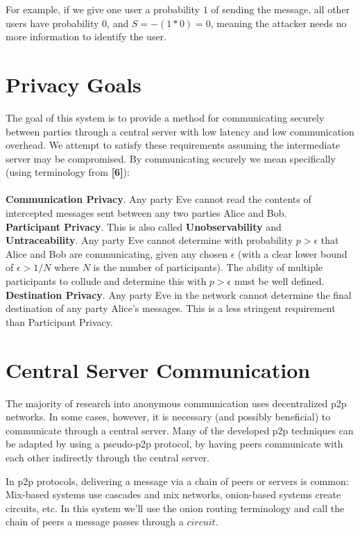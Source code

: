 \documentclass{paper}
\begin{document}
For example, if we give one user a probability $1$ of sending the message, all other users have probability 0, and $S = -(1 * 0) = 0$, meaning the attacker needs no more information to identify the user. 



\section{Privacy Goals}
  The goal of this system is to provide a method for communicating securely between parties through a central server with low latency and low communication overhead. We attempt to satisfy these requirements assuming the intermediate server may be compromised. By communicating securely we mean specifically (using terminology from \textbf{[6]}):
  \\\\\textbf{Communication Privacy}. Any party Eve cannot read the contents of intercepted messages sent between any two parties Alice and Bob. 
  \\\textbf{Participant Privacy}. This is also called \textbf{Unobservability} and \textbf{Untraceability}. Any party Eve cannot determine with probability $p > \epsilon$ that Alice and Bob are communicating, given any chosen $\epsilon$ (with a clear lower bound of $\epsilon > 1/N$ where $N$ is the number of participants). The ability of multiple participants to collude and determine this with $p > \epsilon$ must be well defined.
  \\\textbf{Destination Privacy}. Any party Eve in the network cannot determine the final destination of any party Alice's messages. This is a less stringent requirement than Participant Privacy.
\section{Central Server Communication}
 The majority of research into anonymous communication uses decentralized p2p networks. In some cases, however, it is necessary (and possibly beneficial) to communicate through a central server. Many of the developed p2p techniques can be adapted by using a pseudo-p2p protocol, by having peers communicate with each other indirectly through the central server. 

 In p2p protocols, delivering a message via a chain of peers or servers is common: Mix-based systems use cascades and mix networks, onion-based systems create circuits, etc. In this system we'll use the onion routing terminology and call the chain of peers a message passes through a $circuit$.
\end{document}
